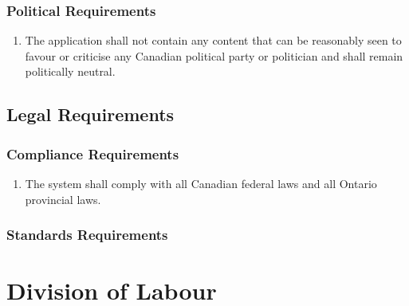 \documentclass[12pt,letterpaper]{article}
\begin{document}
\subsubsection{Political Requirements}
\label{ssub:political_requirements}
\begin{enumerate}[{CP-P}1. ]
	\item The application shall not contain any content that can be reasonably seen to favour or criticise any Canadian political party or politician and shall remain politically neutral.
\end{enumerate}


\subsection{Legal Requirements}
\label{sub:legal_requirements}

\subsubsection{Compliance Requirements}
\label{ssub:compliance_requirements}
\begin{enumerate}[{LR-C}1. ]
	\item The system shall comply with all Canadian federal laws and all Ontario provincial laws.
\end{enumerate}

\subsubsection{Standards Requirements}
\label{ssub:standards_requirements}


\newpage
\appendix
\section{Division of Labour}
\label{sec:division_of_labour}
\end{document}
